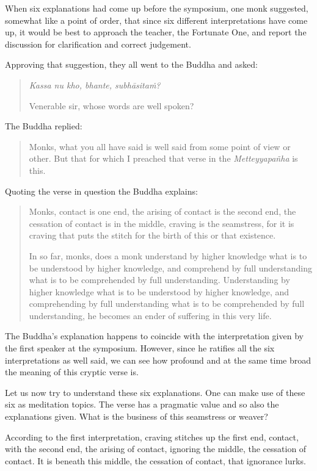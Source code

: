 When six explanations had come up before the symposium, one monk suggested, somewhat like a point of order, that since six different interpretations have come up, it would be best to approach the teacher, the Fortunate One, and report the discussion for clarification and correct judgement.

Approving that suggestion, they all went to the Buddha and asked:

\begin{quote}
\emph{Kassa nu kho, bhante, subhāsitaṁ?}

Venerable sir, whose words are well spoken?
\end{quote}

The Buddha replied:

\begin{quote}
Monks, what you all have said is well said from some point of view or other. But that for which I preached that verse in the \emph{Metteyyapañha} is this.
\end{quote}

Quoting the verse in question the Buddha explains:

\begin{quote}
Monks, contact is one end, the arising of contact is the second end, the cessation of contact is in the middle, craving is the seamstress, for it is craving that puts the stitch for the birth of this or that existence.

In so far, monks, does a monk understand by higher knowledge what is to be understood by higher knowledge, and comprehend by full understanding what is to be comprehended by full understanding. Understanding by higher knowledge what is to be understood by higher knowledge, and comprehending by full understanding what is to be comprehended by full understanding, he becomes an ender of suffering in this very life.
\end{quote}

The Buddha's explanation happens to coincide with the interpretation given by the first speaker at the symposium. However, since he ratifies all the six interpretations as well said, we can see how profound and at the same time broad the meaning of this cryptic verse is.

Let us now try to understand these six explanations. One can make use of these six as meditation topics. The verse has a pragmatic value and so also the explanations given. What is the business of this seamstress or weaver?

According to the first interpretation, craving stitches up the first end, contact, with the second end, the arising of contact, ignoring the middle, the cessation of contact. It is beneath this middle, the cessation of contact, that ignorance lurks.

